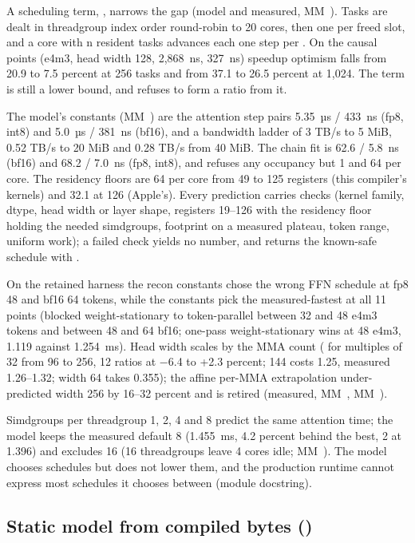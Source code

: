 A scheduling term, , narrows the gap (model and measured, MM~).
Tasks are dealt in threadgroup index order round-robin to 20 cores, then one per freed slot, and a core with n
resident tasks advances each one step per . On the causal points (e4m3, head width
128,  2,868~ns,  327~ns) speedup optimism falls from 20.9 to 7.5 percent at 256 tasks and
from 37.1 to 26.5 percent at 1,024. The term is still a lower bound, and  refuses to form a ratio from it.

The model's constants (MM~) are the attention step pairs 5.35~µs / 433~ns (fp8, int8) and 5.0~µs / 381~ns
(bf16), and a bandwidth ladder of 3 TB/s to 5 MiB, 0.52 TB/s to 20 MiB and 0.28 TB/s from 40 MiB. The chain fit is
62.6 / 5.8~ns (bf16) and 68.2 / 7.0~ns (fp8, int8), and  refuses any occupancy but 1 and 64 per core.
The residency floors are 64 per core from 49 to 125 registers (this compiler's kernels) and 32.1 at 126 (Apple's).
Every prediction carries checks (kernel family, dtype, head width or layer shape, registers 19–126 with the residency floor holding
the needed simdgroups, footprint on a measured plateau, token range, uniform work); a failed check yields no number,
and  returns the known-safe schedule with .

On the retained harness the recon constants chose the wrong FFN
schedule at fp8 48 and bf16 64 tokens, while the  constants pick the measured-fastest
at all 11 points (blocked weight-stationary to token-parallel between 32 and 48 e4m3 tokens and between 48 and 64
bf16; one-pass weight-stationary wins at 48 e4m3, 1.119 against 1.254~ms). Head width scales by the MMA count
( for multiples of 32 from 96 to 256, 12 ratios at −6.4 to +2.3 percent; 144 costs 1.25, measured 1.26–1.32;
width 64 takes 0.355); the affine per-MMA extrapolation under-predicted width 256 by 16–32 percent and is retired (measured,
MM~, MM~).

Simdgroups per threadgroup 1, 2, 4 and 8 predict the same attention time; the model keeps the measured default 8
(1.455~ms, 4.2 percent behind the best, 2 at 1.396) and excludes 16 (16 threadgroups leave 4 cores idle;
MM~). The model chooses schedules but does not lower them, and the production runtime cannot express most
schedules it chooses between (module docstring).

\subsection*{Static model from compiled bytes ()}

